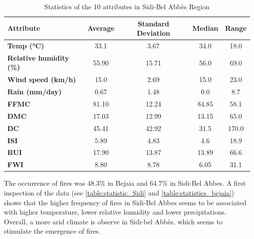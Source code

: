 \documentclass[10pt]{article}
\numberwithin{equation}{section}
\numberwithin{figure}{section}
\numberwithin{table}{section}
\begin{document}
\begin{table}[H]
\centering
\begin{tabular}{|l|c|c|c|c|}
\hline
\textbf{Attribute}              & \textbf{Average} & \textbf{Standard Deviation} &\textbf{Median} &\textbf{Range}   \\ \hline
\textbf{Temp (°C)}              &    33.1                    &    3.67           & 34.0     &  18.0            \\ \hline
\textbf{Relative humidity (\%)} &   55.90                     &       15.71       &    56.0  & 69.0               \\ \hline
\textbf{Wind speed (km/h)}      &   15.0                     &      2.69         & 15.0     &   23.0            \\ \hline
\textbf{Rain (mm/day)}          &   0.67                     &      1.48         & 0.0      &   8.7            \\ \hline
\textbf{FFMC}                   &   81.10                     &      12.24        & 84.85     & 58.1             \\ \hline
\textbf{DMC}                    &   17.03                     &      12.99        &  13.15    &  65.0             \\ \hline
\textbf{DC}                     &   45.41                     &      42.92        &  31.5   & 170.0               \\ \hline
\textbf{ISI}                    &   5.89                      &       4.83       &   4.6   &  18.9              \\ \hline
\textbf{BUI}                    &    17.90                    &       13.87       &  13.89    &  66.6              \\ \hline
\textbf{FWI}                    &   8.80                      &       8.78        &  6.05     &   31.1          \\ \hline
\end{tabular}
\caption{Statistics of the 10 attributes in Sidi-Bel Abbès Region}
\label{table:statistic_Sidi}
\end{table}
The occurrence of fires was 48.3\% in Bejaia and 64.7\% in Sidi-Bel Abbes. A first inspection of the data (see \autoref{table:statistic_Sidi} and \autoref{table:statistics_bejaia}) shows that the higher frequency of fires in Sidi-Bel Abbes seems to be associated with higher temperature, lower relative humidity and lower precipitations. Overall, a more arid climate is observe in Sidi-bel Abbès, which seems to stimulate the emergence of fires.
\end{document}
